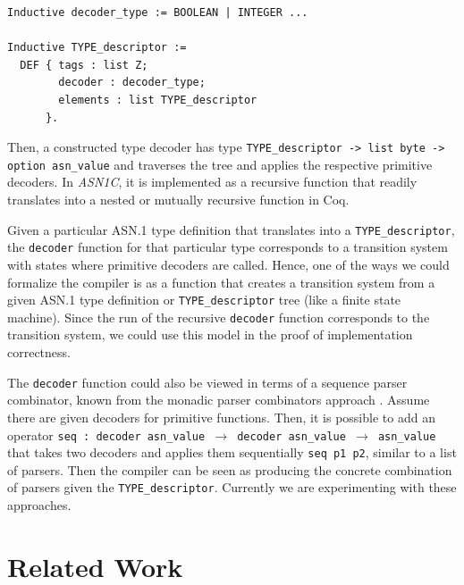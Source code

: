 \documentclass[10p,conference]{IEEEtran}
\begin{document}
 \begin{lstlisting}[language=Coq]
Inductive decoder_type := BOOLEAN | INTEGER ...

Inductive TYPE_descriptor :=
  DEF { tags : list Z;
        decoder : decoder_type;
        elements : list TYPE_descriptor 
      }.
 \end{lstlisting}

 Then, a constructed type decoder has type \lstinline[language=Coq]{TYPE_descriptor -> list byte -> option asn_value} and traverses the tree and applies the respective primitive decoders. In \emph{ASN1C}, it is implemented as
 a recursive function that readily translates into a nested or mutually recursive
 function in Coq.

 Given a particular ASN.1 type definition that translates into a
 \texttt{TYPE\_descriptor}, the \texttt{decoder} function for that
 particular type corresponds to a transition system with states where
 primitive decoders are called. Hence, one of the ways we could
 formalize the compiler is as a function that creates a transition
 system from a given ASN.1 type definition or \texttt{TYPE\_descriptor} tree (like a finite state machine). Since the run of the
 recursive \texttt{decoder} function corresponds to the transition
 system, we could use this model in the proof of implementation
 correctness.

 The \texttt{decoder} function could also be viewed in terms
 of a sequence parser combinator, known from the monadic parser combinators
 approach \cite{MPC}. Assume there are given decoders for primitive
 functions. Then, it is possible to add an operator \texttt{seq : decoder
   asn\_value $\rightarrow$ decoder asn\_value $\rightarrow$ asn\_value} that takes two
 decoders and applies them sequentially \texttt{seq p1 p2}, similar to a
 list of parsers. Then the compiler can be seen as producing the
 concrete combination of parsers given the \texttt{TYPE\_descriptor}. Currently we are experimenting with these approaches.

\section{Related Work}
\end{document}
